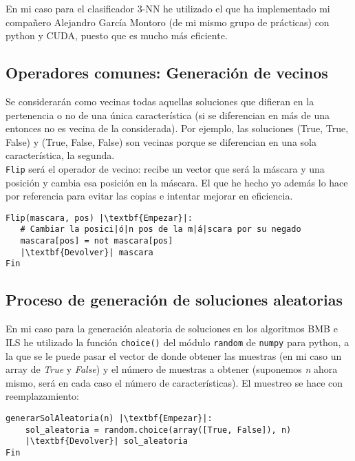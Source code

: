 \documentclass[12pt]{article}
\begin{document}
En mi caso para el clasificador 3-NN he utilizado el que ha implementado mi compañero Alejandro García Montoro (de mi mismo grupo de prácticas) con python y CUDA, puesto que es mucho más eficiente.

\subsection{Operadores comunes: Generación de vecinos}
Se considerarán como vecinas todas aquellas soluciones que difieran en la pertenencia o no de una única característica (si se diferencian en más de una entonces no es vecina de la considerada). Por ejemplo, las soluciones (True, True, False) y (True, False, False) son vecinas porque se diferencian en una sola característica, la segunda.\\
\texttt{Flip} será el operador de vecino: recibe un vector que será la máscara y una posición y cambia esa posición en la máscara. El que he hecho yo además lo hace por referencia para evitar las copias e intentar mejorar en eficiencia.\\

\begin{lstlisting}
Flip(mascara, pos) |\textbf{Empezar}|:
   # Cambiar la posici|ó|n pos de la m|á|scara por su negado 
   mascara[pos] = not mascara[pos]
   |\textbf{Devolver}| mascara
Fin
\end{lstlisting}

\subsection{Proceso de generación de soluciones aleatorias}
En mi caso para la generación aleatoria de soluciones en los algoritmos BMB e ILS he utilizado la función \texttt{choice()} del módulo \texttt{random} de \texttt{numpy} para python, a la que se le puede pasar el vector de donde obtener las muestras (en mi caso un array de \textit{True} y \textit{False}) y el número de muestras a obtener (suponemos \textit{n} ahora mismo, será en cada caso el número de características). El muestreo se hace con reemplazamiento:
\begin{lstlisting}
generarSolAleatoria(n) |\textbf{Empezar}|:
	sol_aleatoria = random.choice(array([True, False]), n)
	|\textbf{Devolver}| sol_aleatoria
Fin
\end{lstlisting}
\end{document}
